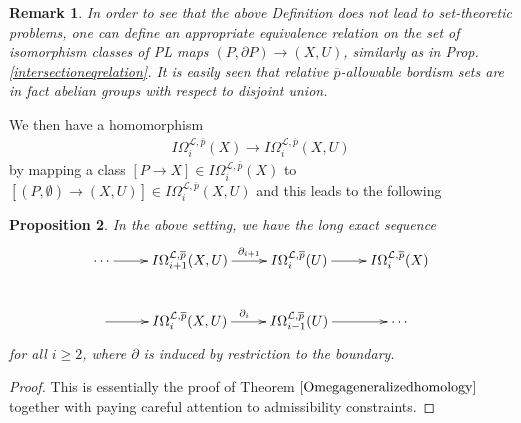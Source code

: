 \documentclass{scrreprt}
\newtheorem{prop}{Proposition}[chapter]
\newtheorem{remark}[prop]{Remark}
\begin{document}
\begin{remark}
In order to see that the above Definition does not lead to set-theoretic problems, one can define an appropriate equivalence relation on the set of isomorphism classes of PL maps $(P, \partial P) \to (X,U)$, similarly as in Prop.\ref{intersectioneqrelation}. It is easily seen that relative $\overline{p}$-allowable bordism sets are in fact abelian groups with respect to disjoint union.
\end{remark}
We then have a homomorphism
\begin{align*}
I\Omega_i^{\mathcal{L},\overline{p}}(X) \to I\Omega_i^{\mathcal{L},\overline{p}}(X,U)
\end{align*}
by mapping a class $[P \to X] \in I\Omega_i^{\mathcal{L},\overline{p}}(X)$ to $[(P,\emptyset) \to (X,U)] \in I\Omega_i^{\mathcal{L},\overline{p}}(X,U)$ and this leads to the following 
\begin{prop}
In the above setting, we have the long exact sequence
\begin{equation*}
\begin{xy}
\xymatrix{ 
\cdots \ar[r]^{}     &   I\Omega_{i+1}^{\mathcal{L},\overline{p}}(X,U) \ar[r]^{\ \ \partial_{i+1}}    &   I\Omega_i^{\mathcal{L},\overline{p}}(U) \ar[r]^{}   &  I\Omega_i^{\mathcal{L},\overline{p}}(X) \\
  \ar[r]^{}   &   I\Omega_i^{\mathcal{L},\overline{p}}(X,U)  \ar[r]^{\partial_i}   &  I\Omega_{i-1}^{\mathcal{L},\overline{p}}(U) \ar[r]^{}   &   \cdots
}
\end{xy}
\end{equation*}
for all $i \geq 2$, where $\partial$ is induced by restriction to the boundary.
\end{prop}

\begin{proof}
This is essentially the proof of Theorem $\ref{Omegageneralizedhomology}$ together with paying careful attention to admissibility constraints.
\end{proof}
\end{document}
